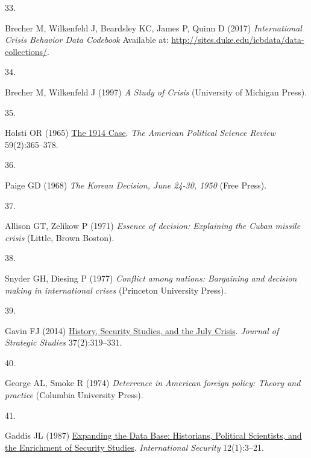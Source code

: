 \documentclass{article}
\newlength{\cslhangindent}
\newlength{\csllabelwidth}
\newlength{\cslentryspacingunit} %
\newenvironment{CSLReferences}[2] %
 {%
  \setlength{\parindent}{0pt}
  \ifodd #1
  \let\oldpar\par
  \def\par{\hangindent=\cslhangindent\oldpar}
  \fi
  \setlength{\parskip}{#2\cslentryspacingunit}
 }%
 {}
\newcommand{\CSLLeftMargin}[1]{\parbox[t]{\csllabelwidth}{#1}}
\newcommand{\CSLRightInline}[1]{\parbox[t]{\linewidth - \csllabelwidth}{#1}\break}
\begin{document}
\begin{CSLReferences}{0}{0}
\leavevmode{}%
\CSLLeftMargin{33. }
\CSLRightInline{Brecher M, Wilkenfeld J, Beardsley KC, James P, Quinn D
(2017) \emph{International {Crisis Behavior Data Codebook}} Available
at: \url{http://sites.duke.edu/icbdata/data-collections/}.}

\leavevmode{}%
\CSLLeftMargin{34. }
\CSLRightInline{Brecher M, Wilkenfeld J (1997) \emph{A {Study} of
{Crisis}} ({University of Michigan Press}).}

\leavevmode{}%
\CSLLeftMargin{35. }
\CSLRightInline{Holsti OR (1965)
\href{https://doi.org/10.2307/1953055}{The 1914 {Case}}. \emph{The
American Political Science Review} 59(2):365--378.}

\leavevmode{}%
\CSLLeftMargin{36. }
\CSLRightInline{Paige GD (1968) \emph{The {Korean Decision}, {June}
24-30, 1950} ({Free Press}).}

\leavevmode{}%
\CSLLeftMargin{37. }
\CSLRightInline{Allison GT, Zelikow P (1971) \emph{Essence of decision:
{Explaining} the {Cuban} missile crisis} ({Little, Brown Boston}).}

\leavevmode{}%
\CSLLeftMargin{38. }
\CSLRightInline{Snyder GH, Diesing P (1977) \emph{Conflict among
nations: {Bargaining} and decision making in international crises}
({Princeton University Press}).}

\leavevmode{}%
\CSLLeftMargin{39. }
\CSLRightInline{Gavin FJ (2014)
\href{https://doi.org/10.1080/01402390.2014.912916}{History, {Security
Studies}, and the {July Crisis}}. \emph{Journal of Strategic Studies}
37(2):319--331.}

\leavevmode{}%
\CSLLeftMargin{40. }
\CSLRightInline{George AL, Smoke R (1974) \emph{Deterrence in {American}
foreign policy: {Theory} and practice} ({Columbia University Press}).}

\leavevmode{}%
\CSLLeftMargin{41. }
\CSLRightInline{Gaddis JL (1987)
\href{https://doi.org/10.2307/2538915}{Expanding the {Data Base}:
{Historians}, {Political Scientists}, and the {Enrichment} of {Security
Studies}}. \emph{International Security} 12(1):3--21.}


\end{CSLReferences}
\end{document}
